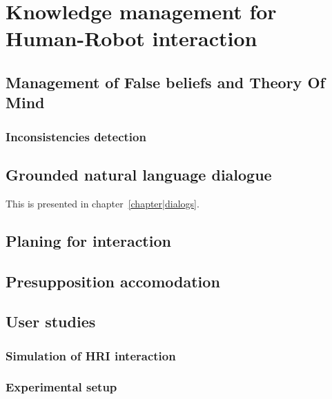 \chapter{Knowledge management for Human-Robot interaction}
\label{chapter|krs-for-hri}

\section{Management of False beliefs and Theory Of Mind}
\label{sect|theory-of-mind}

\subsection{Inconsistencies detection}
\label{sect|inter-model-inconsistencies-detection}


\section{Grounded natural language dialogue}
\label{sect|dialogue-introduction}

This is presented in chapter~\ref{chapter|dialogs}.

\section{Planing for interaction}
\label{sect|planing-for-interaction}


\section{Presupposition accomodation}
\label{sect|presupposition-accomodation}


\section{User studies}
\label{sect|userstudies}

\subsection{Simulation of HRI interaction}
\label{sect|simulation}

\subsection{Experimental setup}
\label{sect|user-experiments}


